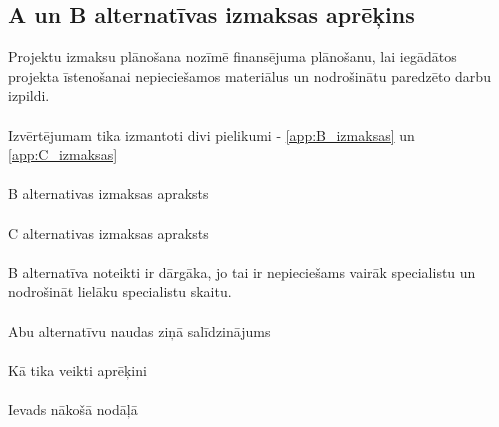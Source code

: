 \subsection{A un B alternatīvas izmaksas aprēķins}
Projektu izmaksu plānošana nozīmē finansējuma plānošanu, lai iegādātos projekta
īstenošanai nepieciešamos materiālus un nodrošinātu paredzēto darbu izpildi.
\paragraph{}
Izvērtējumam tika izmantoti divi pielikumi - \ref{app:B_izmaksas} un \ref{app:C_izmaksas}
\paragraph{}
B alternativas izmaksas apraksts
\paragraph{}
C alternativas izmaksas apraksts
\paragraph{}
B alternatīva noteikti ir dārgāka, jo tai ir nepieciešams vairāk specialistu un nodrošināt
lielāku specialistu skaitu. 
\paragraph{}
Abu alternatīvu naudas ziņā salīdzinājums
\paragraph{}
Kā tika veikti aprēķini
\paragraph{}
Ievads nākošā nodāļā
  